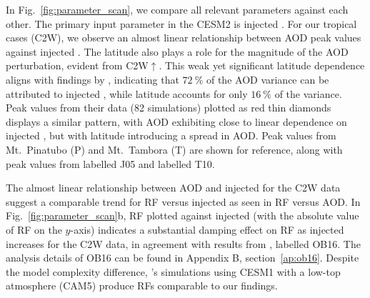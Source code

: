 \documentclass[draft]{agujournal2019}
\newcommand{\iso}[1][i]{{#1}njected \ce{SO2}}
\newcommand{\cwsn}{C2W\(\uparrow\)}
\begin{document}
In Fig.~\ref{fig:parameter_scan}, we compare all relevant parameters against each other.
The primary input parameter in the CESM2 is \iso{}. For our tropical cases
(C2W), we observe an almost linear relationship between AOD peak values
against \iso{}. The latitude also plays a role for the magnitude of the AOD
perturbation, evident from \cwsn{}. This weak yet significant latitude dependence
aligns with findings by , indicating that \(\SI{72}{\percent}\) of
the AOD variance can be attributed to \iso{}, while latitude accounts for only
\(\SI{16}{\percent}\) of the variance. Peak values from their data (82 simulations)
plotted as red thin diamonds displays a similar pattern, with AOD exhibiting close
to linear dependence on \iso{}, but with latitude introducing a spread in AOD.
Peak values from Mt.\ Pinatubo (P) and Mt.\ Tambora (T) are shown for reference, along
with peak values from  labelled J05 and 
labelled T10.

The almost linear relationship between AOD and \iso{} for the C2W data
suggest a comparable trend for RF versus \iso{} as seen in RF versus
AOD. In Fig.~\ref{fig:parameter_scan}b, RF plotted against \iso{} (with the
absolute value of RF on the \(y\)-axis) indicates a substantial damping effect on
RF as \iso{} increases for the C2W data, in agreement with results from
, labelled OB16. The analysis details of OB16 can be
found in Appendix B, section~\ref{ap:ob16}. Despite the model complexity difference,
's simulations using CESM1 with a low-top atmosphere
(CAM5) produce RFs comparable to our findings.
\end{document}
